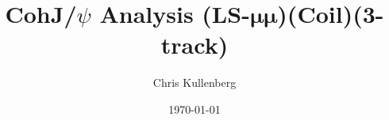 \title{CohJ/$\psi$ Analysis (\textbf{LS}-$\boldsymbol{\mu\mu}$)(\textbf{Coil})(\textbf{3-track})}
\author{Chris Kullenberg}
\date{\today}
